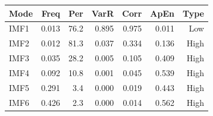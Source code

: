 {\tiny\setlength{\tabcolsep}{1pt}\begin{tabular}{lrrrrrr} \toprule
Mode & Freq & Per & VarR & Corr & ApEn & Type \\ \midrule
IMF1 & 0.013 & 76.2 & 0.895 & 0.975 & 0.011 & Low \\ 
IMF2 & 0.012 & 81.3 & 0.037 & 0.334 & 0.136 & High \\ 
IMF3 & 0.035 & 28.2 & 0.005 & 0.105 & 0.409 & High \\ 
IMF4 & 0.092 & 10.8 & 0.001 & 0.045 & 0.539 & High \\ 
IMF5 & 0.291 & 3.4 & 0.000 & 0.019 & 0.443 & High \\ 
IMF6 & 0.426 & 2.3 & 0.000 & 0.014 & 0.562 & High \\ 
\bottomrule \end{tabular}}